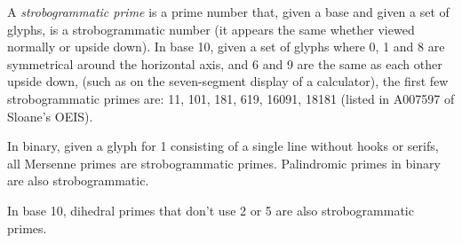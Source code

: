 \documentclass[12pt]{article}
\begin{document}
A {\em strobogrammatic prime} is a prime number that, given a base and given a set of glyphs, is a strobogrammatic number (it appears the same whether viewed normally or upside down). In base 10, given a set of glyphs where 0, 1 and 8 are symmetrical around the horizontal axis, and 6 and 9 are the same as each other upside down, (such as on the seven-segment display of a calculator), the first few strobogrammatic primes are: 11, 101, 181, 619, 16091, 18181 (listed in A007597 of Sloane's OEIS).

In binary, given a glyph for 1 consisting of a single line without hooks or serifs, all Mersenne primes are strobogrammatic primes. Palindromic primes in binary are also strobogrammatic.

In base 10, dihedral primes that don't use 2 or 5 are also strobogrammatic primes.
\end{document}
